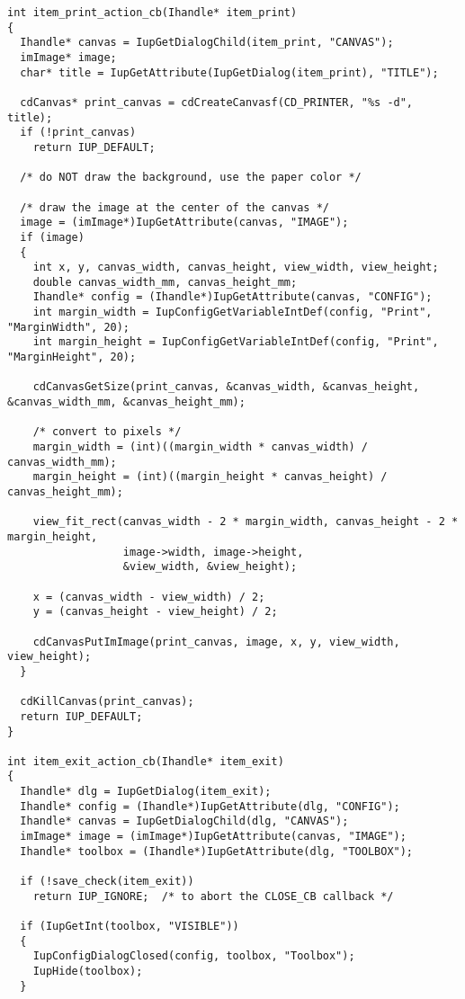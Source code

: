 \documentclass{ctexart}
\begin{document}
\begin{lstlisting}
int item_print_action_cb(Ihandle* item_print)
{
  Ihandle* canvas = IupGetDialogChild(item_print, "CANVAS");
  imImage* image;
  char* title = IupGetAttribute(IupGetDialog(item_print), "TITLE");

  cdCanvas* print_canvas = cdCreateCanvasf(CD_PRINTER, "%s -d", title);
  if (!print_canvas)
    return IUP_DEFAULT;

  /* do NOT draw the background, use the paper color */

  /* draw the image at the center of the canvas */
  image = (imImage*)IupGetAttribute(canvas, "IMAGE");
  if (image)
  {
    int x, y, canvas_width, canvas_height, view_width, view_height;
    double canvas_width_mm, canvas_height_mm;
    Ihandle* config = (Ihandle*)IupGetAttribute(canvas, "CONFIG");
    int margin_width = IupConfigGetVariableIntDef(config, "Print", "MarginWidth", 20);
    int margin_height = IupConfigGetVariableIntDef(config, "Print", "MarginHeight", 20);

    cdCanvasGetSize(print_canvas, &canvas_width, &canvas_height, &canvas_width_mm, &canvas_height_mm);

    /* convert to pixels */
    margin_width = (int)((margin_width * canvas_width) / canvas_width_mm);
    margin_height = (int)((margin_height * canvas_height) / canvas_height_mm);

    view_fit_rect(canvas_width - 2 * margin_width, canvas_height - 2 * margin_height, 
                  image->width, image->height, 
                  &view_width, &view_height);

    x = (canvas_width - view_width) / 2;
    y = (canvas_height - view_height) / 2;

    cdCanvasPutImImage(print_canvas, image, x, y, view_width, view_height);
  }

  cdKillCanvas(print_canvas);
  return IUP_DEFAULT;
}

int item_exit_action_cb(Ihandle* item_exit)
{
  Ihandle* dlg = IupGetDialog(item_exit);
  Ihandle* config = (Ihandle*)IupGetAttribute(dlg, "CONFIG");
  Ihandle* canvas = IupGetDialogChild(dlg, "CANVAS");
  imImage* image = (imImage*)IupGetAttribute(canvas, "IMAGE");
  Ihandle* toolbox = (Ihandle*)IupGetAttribute(dlg, "TOOLBOX");

  if (!save_check(item_exit))
    return IUP_IGNORE;  /* to abort the CLOSE_CB callback */

  if (IupGetInt(toolbox, "VISIBLE"))
  {
    IupConfigDialogClosed(config, toolbox, "Toolbox");
    IupHide(toolbox);
  }


\end{lstlisting}
\end{document}
